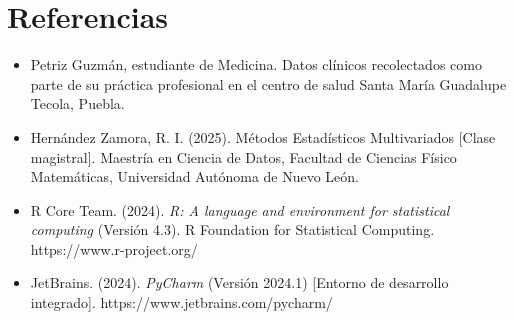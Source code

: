 \documentclass[12pt]{report}
\begin{document}
\newpage
\section{Referencias}

\begin{itemize}
    \item Petriz Guzmán, estudiante de Medicina. Datos clínicos recolectados como parte de su práctica profesional en el centro de salud Santa María Guadalupe Tecola, Puebla.
    
    \item Hernández Zamora, R. I. (2025). Métodos Estadísticos Multivariados [Clase magistral]. Maestría en Ciencia de Datos, Facultad de Ciencias Físico Matemáticas, Universidad Autónoma de Nuevo León.


    \item R Core Team. (2024). \textit{R: A language and environment for statistical computing} (Versión 4.3). R Foundation for Statistical Computing. https://www.r-project.org/

    \item JetBrains. (2024). \textit{PyCharm} (Versión 2024.1) [Entorno de desarrollo integrado]. https://www.jetbrains.com/pycharm/



\end{itemize}
\end{document}
